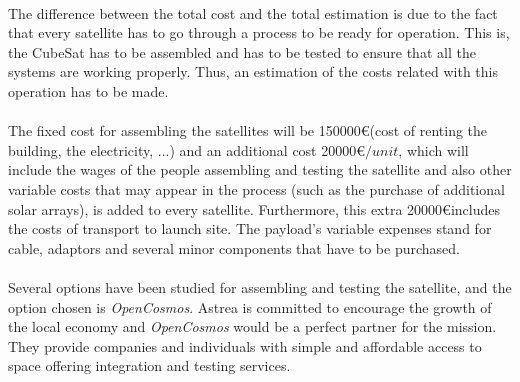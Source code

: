 \paragraph{}The difference between the total cost and the total estimation is due to the fact that every satellite has to go through a process to be ready for operation. This is, the CubeSat has to be assembled and has to be tested to ensure that all the systems are working properly. Thus, an estimation of the costs related with this operation has to be made.

\paragraph{}The fixed cost for assembling the satellites will be 150000\euro (cost of renting the building, the electricity, ...) and an additional cost 20000\euro $ / unit$, which will include the wages of the people assembling and testing the satellite and also other variable costs that may appear in the process (such as the purchase of additional solar arrays), is added to every satellite. Furthermore, this extra 20000\euro includes the costs of transport to launch site. The payload's variable expenses stand for cable, adaptors and several minor components that have to be purchased.

\paragraph{}Several options have been studied for assembling and testing the satellite, and the option chosen is \textit{OpenCosmos}. Astrea is committed to encourage the growth of the local economy and \textit{OpenCosmos} would be a perfect partner for the mission. They provide companies and individuals with simple and affordable access to space offering integration and testing services.
